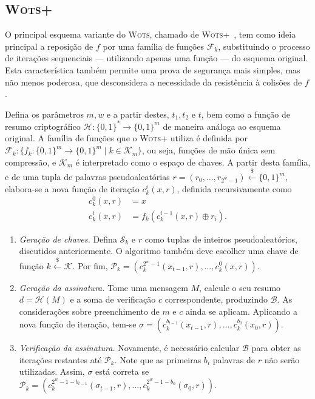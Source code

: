 \documentclass[12pt]{report}
\newcommand{\pk}{$\mathcal{P}_k$}
\newcommand{\sk}{$\mathcal{S}_k$}
\newcommand{\binwds}[1]{\{0, 1\}^{#1}}
\begin{document}
\subsection{\textsc{Wots+}}

O principal esquema variante do \textsc{Wots}, chamado de \textsc{Wots+}~\cite{cryptoeprint:2017:965}, tem como ideia principal a reposição de $f$ por uma família de funções $\mathcal{F}_k$, substituindo o processo de iterações sequenciais --- utilizando apenas uma função --- do esquema original. Esta característica também permite uma prova de segurança mais simples, mas não menos poderosa, que desconsidera a necessidade da resistência à colisões de $f$.

Defina os parâmetros $m, w$ e a partir destes, $t_1, t_2 \text{ e } t$, bem como a função de resumo criptográfico $\mathcal{H} : \binwds{*} \longrightarrow \binwds{m}$ de maneira análoga ao esquema original. A família de funções que o \textsc{Wots+} utiliza é definida por $\mathcal{F}_k : \{f_k : \binwds{m} \longrightarrow \binwds{m} \mid k \in \mathcal{K}_m\}$, ou seja, funções de mão única sem compressão, e $\mathcal{K}_m$ é interpretado como o espaço de chaves. A partir desta família, e de uma tupla de palavras pseudoaleatórias $r = (r_0, \dots, r_{2^w - 1}) \stackrel{\$}{\longleftarrow} \binwds{m}$, elabora-se a nova função de iteração $c^{i}_{k}(x, r)$, definida recursivamente como \begin{equation}
\begin{split}
c^{0}_{k}(x, r) &= x \\
c^{i}_{k}(x, r) &= f_k(c^{i-1}_{k}(x, r) \oplus r_i).
\end{split}
\end{equation}

\begin{enumerate}

    \item[] \emph{Geração de chaves.} Defina \sk{} e $r$ como tuplas de inteiros pseudoaleatórios, discutidos anteriormente. O algoritmo também deve escolher uma chave de função $k \stackrel{\$}\longleftarrow \mathcal{K}$. Por fim, $\text{\pk{}} = (c^{2^w-1}_{k}(x_{t-1}, r), \dots, c^{0}_{k}(x, r))$.
    
    \item[] \emph{Geração da assinatura.} Tome uma mensagem $M$, calcule o seu resumo $d = \mathcal{H}(M)$ e a soma de verificação $c$ correspondente, produzindo $\mathcal{B}$. As considerações sobre preenchimento de $m$ e $c$ ainda se aplicam. Aplicando a nova função de iteração, tem-se $\sigma = (c^{b_{t - 1}}_{k}(x_{t-1}, r), \dots, c^{b_{0}}_{k}(x_{0}, r))$.
    
    \item[] \emph{Verificação da assinatura.} Novamente, é necessário calcular $\mathcal{B}$ para obter as iterações restantes até \pk{}. Note que as primeiras $b_i$ palavras de $r$ não serão utilizadas. Assim, $\sigma$ está correta se $\text{\pk{}} = (c^{2^{w} - 1 - b_{t - 1}}_{k}(\sigma_{t-1}, r), \dots, c^{2^{w} - 1 - b_{0}}_{k}(\sigma_{0}, r))$. 

\end{enumerate}
\end{document}

